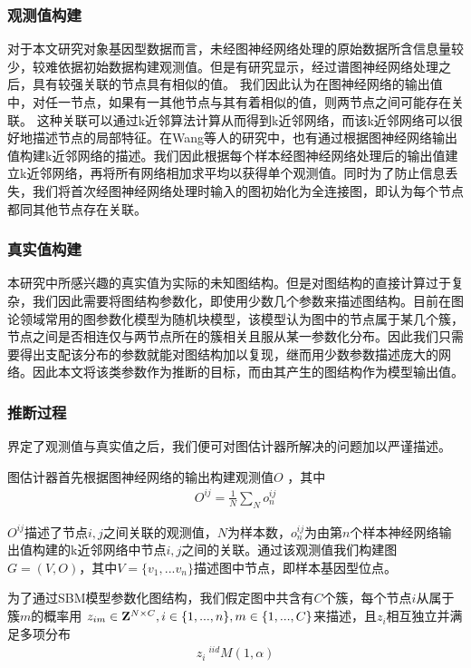 \subsubsection{观测值构建}
对于本文研究对象基因型数据而言，未经图神经网络处理的原始数据所含信息量较少，较难依据初始数据构建观测值。但是有研究显示，经过谱图神经网络处理之后，具有较强关联的节点具有相似的值。\cite{hamilton_inductive_2018} 我们因此认为在图神经网络的输出值中，对任一节点，如果有一其他节点与其有着相似的值，则两节点之间可能存在关联。 这种关联可以通过k近邻算法\cite{preparata_computational_1985}计算从而得到k近邻网络，而该k近邻网络可以很好地描述节点的局部特征。在Wang\cite{wang_graph_2021}等人的研究中，也有通过根据图神经网络输出值构建k近邻网络的描述。我们因此根据每个样本经图神经网络处理后的输出值建立k近邻网络，再将所有网络相加求平均以获得单个观测值。同时为了防止信息丢失，我们将首次经图神经网络处理时输入的图初始化为全连接图，即认为每个节点都同其他节点存在关联。
\subsubsection{真实值构建}
本研究中所感兴趣的真实值为实际的未知图结构。但是对图结构的直接计算过于复杂，我们因此需要将图结构参数化，即使用少数几个参数来描述图结构。目前在图论领域常用的图参数化模型为随机块模型\cite{holland_stochastic_1983}，该模型认为图中的节点属于某几个簇，节点之间是否相连仅与两节点所在的簇相关且服从某一参数化分布。因此我们只需要得出支配该分布的参数就能对图结构加以复现，继而用少数参数描述庞大的网络。因此本文将该类参数作为推断的目标，而由其产生的图结构作为模型输出值。
\subsubsection{推断过程}
界定了观测值与真实值之后，我们便可对图估计器所解决的问题加以严谨描述。

图估计器首先根据图神经网络的输出构建观测值$O$ ，其中
\begin{equation}\begin{aligned}
    O^{ij}=\frac{1}{N}\sum_N o^{ij}_n
\end{aligned}\end{equation}

$O^{ij}$描述了节点$i,j$之间关联的观测值，$N$为样本数，$o^{ij}_n$为由第$n$个样本神经网络输出值构建的k近邻网络中节点$i,j$之间的关联。通过该观测值我们构建图$G=(V,O)$，其中$V=\{v_1,...v_n\}$描述图中节点，即样本基因型位点。

为了通过SBM模型参数化图结构，我们假定图中共含有$C$个簇，每个节点$i$从属于簇$m$的概率用 $z_{im}\in \bold{Z}^{N\times C},i\in \{1, ... ,n\},m\in\{1,...,C\}$来描述，且$z_i$相互独立并满足多项分布 
\begin{equation}\begin{aligned}
    z_i ~^{iid} M(1,\alpha)
\end{aligned}\end{equation}


